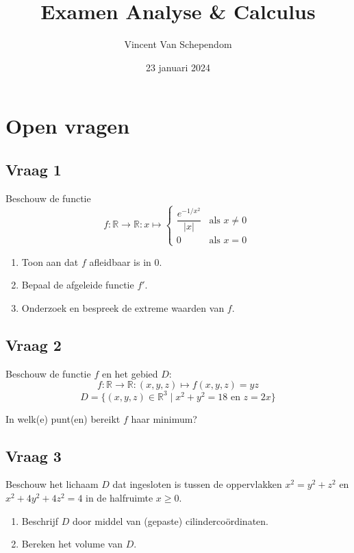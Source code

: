 \documentclass[kulak]{kulakarticle} %
\title{Examen Analyse \& Calculus}
\author{Vincent Van Schependom}
\date{23 januari 2024}
\newcommand{\R}{\mathbb{R}}
\begin{document}
	\maketitle

	\section*{Open vragen}

	\subsection*{Vraag 1}
	\renewcommand{\arraystretch}{2}
	Beschouw de functie \[ f :\R \to \R : x \mapsto \left\{
	\begin{array}{ll}
		\dfrac{  e^{-1/x^2}  }{ |x| } 	& \text{als } x\neq0 \\
		0 														& \text{als } x=0
	\end{array} \right. \ \]

	\begin{enumerate}
		\item Toon aan dat \(f\) afleidbaar is in \(0\).
		\item Bepaal de afgeleide functie \(f'\).
		\item Onderzoek en bespreek de extreme waarden van \(f\).
	\end{enumerate}

	\subsection*{Vraag 2}

	Beschouw de functie \(f\) en het gebied \(D\): \[ f : \R \to \R : (x,y,z) \mapsto f(x,y,z) = yz \]\[ D = \{ (x,y,z) \in \R^3 \mid x^2+y^2=18 \text{ en } z=2x \} \]

	In welk(e) punt(en) bereikt \(f\) haar minimum?

	\subsection*{Vraag 3}

	Beschouw het lichaam \(D\) dat ingesloten is tussen de oppervlakken \(x^2=y^2+z^2\) en \(x^2+4y^2+4z^2=4\) in de halfruimte \(x\geq0\).

	\begin{enumerate}
		\item Beschrijf \(D\) door middel van (gepaste) cilindercoördinaten.
		\item Bereken het volume van \(D\).
	\end{enumerate}
\end{document}

